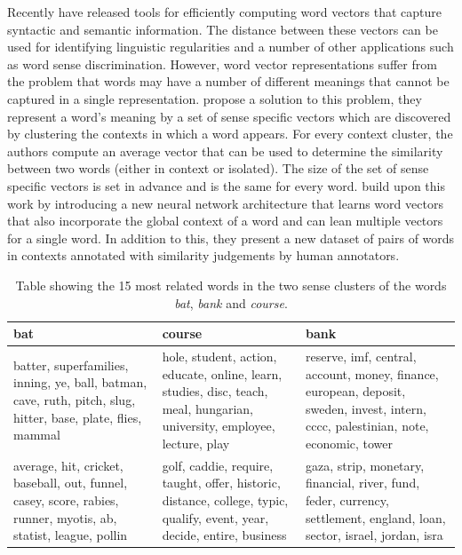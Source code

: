 \documentclass[11pt]{article}
\begin{document}
Recently \cite{word2vec} have released tools for efficiently computing word vectors that capture syntactic and semantic information. The distance between these vectors can be used for identifying linguistic regularities \cite{regularities} and a number of other applications such as word sense discrimination. However, word vector representations suffer from the problem that words may have a number of different meanings that cannot be captured in a single representation. \cite{multi} propose a solution to this problem, they represent a word's meaning by a set of sense specific vectors which are discovered by clustering the contexts in which a word appears. For every context cluster, the authors compute an average vector that can be used to determine the similarity between two words (either in context or isolated). The size of the set of sense specific vectors is set in advance and is the same for every word. \cite{global} build upon this work by introducing a new neural network architecture that learns word vectors that also incorporate the global context of a word and can lean multiple vectors for a single word. In addition to this, they present a new dataset of pairs of words in contexts annotated with similarity judgements by human annotators. 

\begin{table}
    \begin{tabular}{|p{5cm}|p{5cm}|p{5cm}|}
    \hline
    \textbf{bat} & \textbf{course} & \textbf{bank}                                                                                                                                \\ \hline
    batter, superfamilies, inning, ye, ball, batman, cave, ruth, pitch, slug, hitter, base, plate, flies, mammal    & hole, student, action, educate, online, learn, studies, disc, teach, meal, hungarian, university, employee, lecture, play & reserve, imf, central, account, money, finance, european, deposit, sweden, invest, intern, cccc, palestinian, note, economic, tower \\ \hline
    average, hit, cricket, baseball, out, funnel, casey, score, rabies, runner, myotis, ab, statist, league, pollin & golf, caddie, require, taught, offer, historic, distance, college, typic, qualify, event, year, decide, entire, business  & gaza, strip, monetary, financial, river, fund, feder, currency, settlement, england, loan, sector, israel, jordan, isra             \\\hline
    \end{tabular}
    \caption{Table showing the 15 most related words in the two sense clusters of the words \textit{bat}, \textit{bank} and \textit{course}. }
\label{coconutres}

\end{table}
\end{document}
